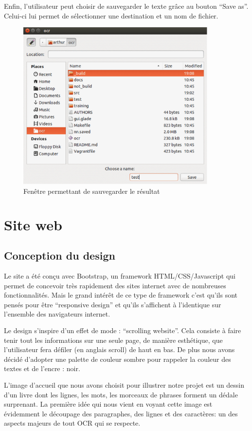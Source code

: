 \documentclass[11pt]{report}
\begin{document}
Enfin, l'utilisateur peut choisir de sauvegarder le texte grâce au bouton  ``Save as''. Celui-ci lui permet de sélectionner une destination et un nom de fichier.

\begin{figure}[htbp]
\centering
\includegraphics[width=10cm]{gui-save.png}
\caption{Fenêtre permettant de sauvegarder le résultat}
\end{figure}

\chapter{Site web}

\section{Conception du design}

Le site a été conçu avec Bootstrap, un framework HTML/CSS/Javascript qui permet de concevoir très rapidement des sites internet avec de nombreuses fonctionnalités. Mais le grand intérêt de ce type de framework c’est qu’ils sont pensés pour être “responsive design” et qu’ils s’affichent à l’identique sur l’ensemble des navigateurs internet.

Le design s'inspire d'un effet de mode : ``scrolling website''. Cela consiste à faire tenir tout les informations sur une seule page, de manière esthétique, que l'utilisateur fera défiler (en anglais scroll) de haut en bas. De plus nous avons décidé d'adopter une palette de couleur sombre pour rappeler la couleur des textes et de l'encre : noir.

L'image d'accueil que nous avons choisit pour illustrer notre projet est un dessin d'un livre dont les lignes, les mots, les morceaux de phrases forment un dédale surprenant. La première idée qui nous vient en voyant cette image est évidemment le découpage des paragraphes, des lignes et des caractères: un des aspects majeurs de tout OCR qui se respecte.
\end{document}
